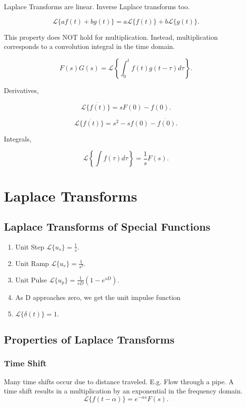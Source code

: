 \documentclass[12pt, a4paper]{report}
\begin{document}
  Laplace Transforms are linear. Inverse Laplace transforms too.

  \[
      \mathcal{L}\{af(t) + bg(t)\} = a \mathcal{L}\{f(t)\} + b \mathcal{L}\{g(t)\}
    .\]

  This property does NOT hold for multiplication. Instead, multiplication corresponds to a convolution integral in the time domain.

  \[
      F(s)G(s) = \mathcal{L}\left\{\int_0^t f(t)g(t - \tau) d\tau\right\}
    .\]

  Derivatives,

  \[
      \mathcal{L}\{\dot{f(t)}\} = sF(0) - f(0)
    .\]

  \[
      \mathcal{L}\{\ddot{f(t)}\} = s ^2 - sf(0) - \dot{f(0)}
    .\]

  Integrals,

  \[
      \mathcal{L}\left\{\int f(\tau)d \tau \right\} = \frac{1}{s} F(s)
    .\]


  \chapter{Laplace Transforms}

  \section{Laplace Transforms of Special Functions}

  \begin{enumerate}
    \item Unit Step $ \mathcal{L}\{u_s\} = \frac{1}{s}. $
    \item Unit Ramp $ \mathcal{L}\{u_r\} = \frac{1}{s ^2}. $
    \item Unit Pulse $ \mathcal{L}\{u_p\} = \frac{1}{sD} \left( 1-e^{sD} \right). $
    \item As D approaches zero, we get the unit impulse function
    \item $ \mathcal{L}\{\delta(t)\} = 1. $
  \end{enumerate}

  \section{Properties of Laplace Transforms}

  \subsection{Time Shift}
  Many time shifts occur due to distance traveled. E.g. Flow through a pipe. A time shift results in a multiplication by an exponential in the frequency domain.
  \[
      \mathcal{L}\{f(t-\alpha)\} = e^{-\alpha s}F(s)
    .\]
\end{document}
